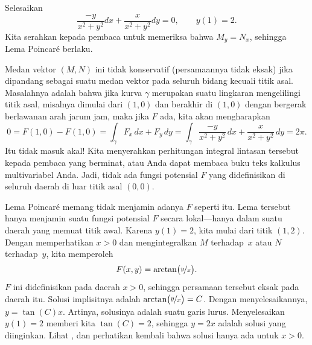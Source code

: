 \begin{example} \label{exact:examplevortex}
Selesaikan
\begin{equation*}
\frac{-y}{x^2+y^2} dx + \frac{x}{x^2+y^2} dy = 0 , \qquad y(1) = 2.
\end{equation*}
Kita serahkan kepada pembaca untuk memeriksa bahwa
$M_y = N_x$,
sehingga Lema Poincar\'e berlaku.

Medan vektor $(M,N)$ ini tidak konservatif (persamaannya tidak eksak)
jika dipandang sebagai suatu medan vektor
pada seluruh bidang kecuali titik asal.  Masalahnya adalah bahwa jika kurva $\gamma$
merupakan suatu lingkaran mengelilingi titik asal, misalnya dimulai dari $(1,0)$ dan
berakhir di $(1,0)$ dengan bergerak berlawanan arah jarum jam, maka jika $F$ ada, kita akan mengharapkan
\begin{equation*}
0 = F(1,0) - F(1,0) = \int_\gamma F_x \, dx + F_y \, dy = \int_\gamma \frac{-y}{x^2+y^2} \, dx +
\frac{x}{x^2+y^2} \, dy = 2\pi .
\end{equation*}
Itu tidak masuk akal!
Kita menyerahkan perhitungan integral lintasan tersebut kepada pembaca yang berminat, atau
Anda dapat membaca buku teks kalkulus multivariabel Anda.  Jadi, tidak ada
fungsi potensial $F$ yang didefinisikan di seluruh daerah di luar titik asal $(0,0)$.

Lema Poincar\'e memang tidak menjamin adanya $F$ seperti itu.
Lema tersebut hanya menjamin suatu fungsi potensial $F$ secara lokal---hanya dalam
suatu daerah yang memuat titik awal.  Karena $y(1) = 2$,
kita mulai dari titik $(1,2)$.  Dengan memperhatikan $x > 0$ dan
mengintegralkan $M$ terhadap~$x$ atau $N$ terhadap~$y$, kita memperoleh
\begin{equation*}
F(x,y) = \arctan \bigl( \nicefrac{y}{x} \bigr) .
\end{equation*}
$F$ ini didefinisikan pada daerah $x > 0$, sehingga persamaan tersebut eksak pada
daerah itu.
Solusi implisitnya adalah
$\arctan \bigl( \nicefrac{y}{x} \bigr) = C$.  Dengan menyelesaikannya,
$y = \tan(C) x$.  Artinya, solusinya adalah suatu garis lurus.  Menyelesaikan $y(1) =
2$ memberi kita $\tan(C) = 2$, sehingga $y= 2x$ adalah solusi yang diinginkan.
Lihat , dan perhatikan kembali bahwa solusi hanya ada untuk
$x > 0$.
\begin{myfig}
\capstart
{}
\caption{Solusi dari
$\frac{-y}{x^2+y^2} dx + \frac{x}{x^2+y^2} dy = 0$, $y(1) = 2$,
dengan titik awal ditandai.\label{exact:y2x}}
\end{myfig}
\end{example}

